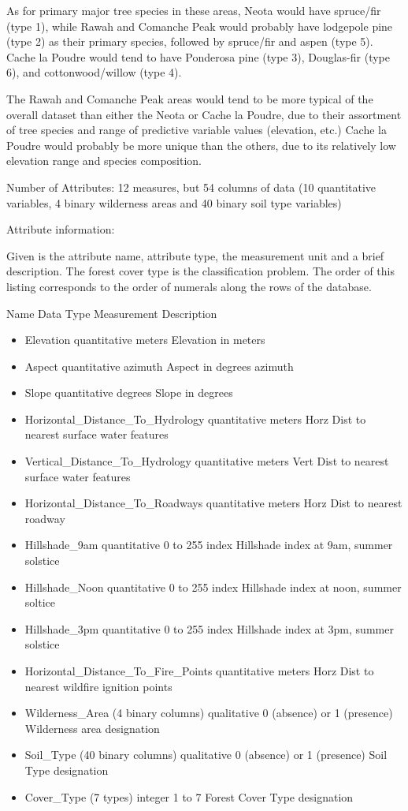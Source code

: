 \documentclass[11pt]{article}
\providecommand{\tightlist}{%
      \setlength{\itemsep}{0pt}\setlength{\parskip}{0pt}}
\begin{document}
As for primary major tree species in these areas, Neota would have
spruce/fir (type 1), while Rawah and Comanche Peak would probably have
lodgepole pine (type 2) as their primary species, followed by spruce/fir
and aspen (type 5). Cache la Poudre would tend to have Ponderosa pine
(type 3), Douglas-fir (type 6), and cottonwood/willow (type 4).

The Rawah and Comanche Peak areas would tend to be more typical of the
overall dataset than either the Neota or Cache la Poudre, due to their
assortment of tree species and range of predictive variable values
(elevation, etc.) Cache la Poudre would probably be more unique than the
others, due to its relatively low elevation range and species
composition.

Number of Attributes: 12 measures, but 54 columns of data (10
quantitative variables, 4 binary wilderness areas and 40 binary soil
type variables)

Attribute information:

Given is the attribute name, attribute type, the measurement unit and a
brief description. The forest cover type is the classification problem.
The order of this listing corresponds to the order of numerals along the
rows of the database.

Name Data Type Measurement Description

\begin{itemize}
\tightlist
\item
  Elevation quantitative meters Elevation in meters
\item
  Aspect quantitative azimuth Aspect in degrees azimuth
\item
  Slope quantitative degrees Slope in degrees
\item
  Horizontal\_Distance\_To\_Hydrology quantitative meters Horz Dist to
  nearest surface water features
\item
  Vertical\_Distance\_To\_Hydrology quantitative meters Vert Dist to
  nearest surface water features
\item
  Horizontal\_Distance\_To\_Roadways quantitative meters Horz Dist to
  nearest roadway
\item
  Hillshade\_9am quantitative 0 to 255 index Hillshade index at 9am,
  summer solstice
\item
  Hillshade\_Noon quantitative 0 to 255 index Hillshade index at noon,
  summer soltice
\item
  Hillshade\_3pm quantitative 0 to 255 index Hillshade index at 3pm,
  summer solstice
\item
  Horizontal\_Distance\_To\_Fire\_Points quantitative meters Horz Dist
  to nearest wildfire ignition points
\item
  Wilderness\_Area (4 binary columns) qualitative 0 (absence) or 1
  (presence) Wilderness area designation
\item
  Soil\_Type (40 binary columns) qualitative 0 (absence) or 1 (presence)
  Soil Type designation
\item
  Cover\_Type (7 types) integer 1 to 7 Forest Cover Type designation
\end{itemize}
\end{document}
